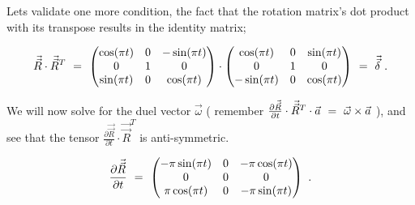 \documentclass{article}
\begin{document}
Lets validate one more condition, the fact that the rotation matrix's dot product with its transpose results in the identity matrix;

\begin{equation} \label{eq:1}
\vec{\vec{R}} \cdot \vec{\vec{R}}^{T} \hspace{0.125cm} =  \hspace{0.125cm} \begin{pmatrix} \cos ( \pi t ) & 0 & - \sin ( \pi t ) \\ 0 & 1 & 0 \\ \sin ( \pi t ) & 0 & \cos ( \pi t ) \end{pmatrix} \cdot \begin{pmatrix} \cos ( \pi t ) & 0 & \sin ( \pi t ) \\ 0 & 1 & 0 \\ - \sin ( \pi t ) & 0 & \cos ( \pi t ) \end{pmatrix} \hspace{0.125cm} =  \hspace{0.125cm} \vec{\vec{\delta}} \hspace{0.125cm} .
\end{equation} 

We will now solve for the duel vector \begin{math} \vec{\omega} \end{math} ( remember \begin{math} \frac{\partial{\vec{\vec{R}}}}{\partial{t}} \cdot \vec{\vec{R}}^{T} \cdot \vec{a} \hspace{0.125cm} =  \hspace{0.125cm} \vec{\omega} \times \vec{a} \end{math} ), and see that the tensor \begin{math} \frac{\partial{\vec{\vec{R}}}}{\partial{t}} \cdot \vec{\vec{R}}^{T} \end{math} is anti-symmetric. 

\begin{equation} \label{eq:1}
\frac{\partial{\vec{\vec{R}}}}{\partial{t}} \hspace{0.125cm} =  \hspace{0.125cm} \begin{pmatrix} - \pi \sin ( \pi t ) & 0 & - \pi \cos ( \pi t ) \\ 0 & 0 & 0 \\ \pi \cos ( \pi t ) & 0 & - \pi \sin ( \pi t ) \end{pmatrix} \hspace{0.125cm} .
\end{equation} 
\end{document}
